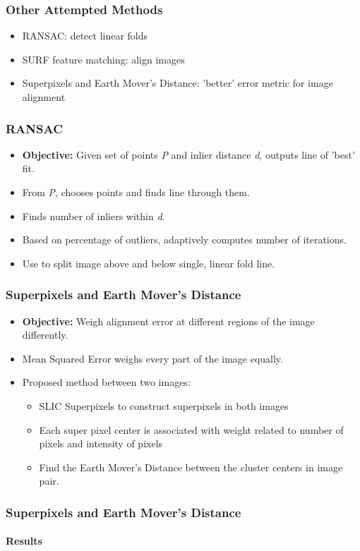 \documentclass{beamer}
\begin{document}
\begin{frame}
\frametitle{Other Attempted Methods}
\begin{itemize}
\item RANSAC: detect linear folds
\item SURF feature matching: align images
\item Superpixels and Earth Mover's Distance: 'better' error metric for image alignment
\end{itemize}
\end{frame}

\begin{frame}
\frametitle{RANSAC}
\begin{itemize}
\item \textbf{Objective:} Given set of points \textit{P} and inlier distance \textit{d}, outputs line of 'best' fit. 
\item From \textit{P}, chooses points and finds line through them. 
\item Finds number of inliers within \textit{d}. 
\item Based on percentage of outliers, adaptively computes number of iterations.
\item Use to split image above and below single, linear fold line. 
\end{itemize}
\end{frame}

\begin{frame}
\frametitle{Superpixels and Earth Mover's Distance}
\begin{itemize}
\item \textbf{Objective:} Weigh alignment error at different regions of the image differently.
\item Mean Squared Error weighs every part of the image equally.
\item Proposed method between two images:
\begin{itemize}
\item SLIC Superpixels to construct superpixels in both images
\item Each super pixel center is associated with weight related to number of pixels and intensity of pixels
\item Find the Earth Mover's Distance between the cluster centers in image pair.
\end{itemize}
\end{itemize}
\end{frame}

\begin{frame}
\frametitle{Superpixels and Earth Mover's Distance}
\framesubtitle{Results}

\end{frame}
\end{document}
